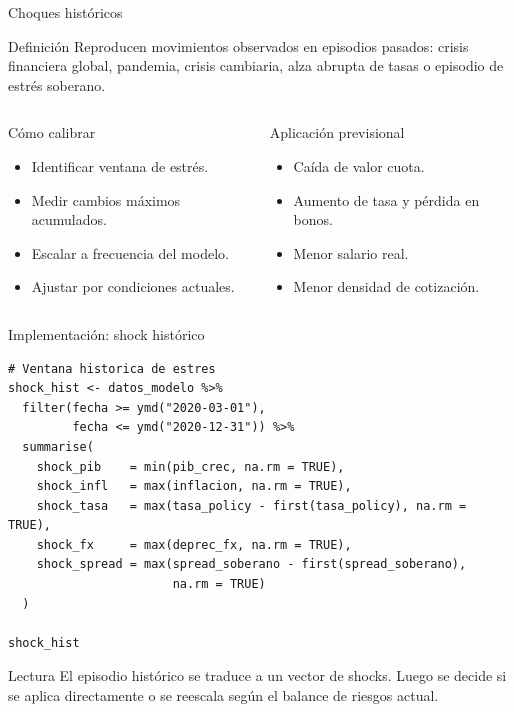 \documentclass[10pt,aspectratio=169]{beamer}
\begin{document}
\begin{frame}{Choques históricos}
\begin{block}{Definición}
Reproducen movimientos observados en episodios pasados: crisis financiera global, pandemia, crisis cambiaria, alza abrupta de tasas o episodio de estrés soberano.
\end{block}

\begin{columns}
\begin{block}{Cómo calibrar}
\begin{itemize}
  \item Identificar ventana de estrés.
  \item Medir cambios máximos acumulados.
  \item Escalar a frecuencia del modelo.
  \item Ajustar por condiciones actuales.
\end{itemize}
\end{block}

\begin{block}{Aplicación previsional}
\begin{itemize}
  \item Caída de valor cuota.
  \item Aumento de tasa y pérdida en bonos.
  \item Menor salario real.
  \item Menor densidad de cotización.
\end{itemize}
\end{block}
\end{columns}
\end{frame}

\begin{frame}[fragile]{Implementación: shock histórico}
\begin{lstlisting}
# Ventana historica de estres
shock_hist <- datos_modelo %>%
  filter(fecha >= ymd("2020-03-01"),
         fecha <= ymd("2020-12-31")) %>%
  summarise(
    shock_pib    = min(pib_crec, na.rm = TRUE),
    shock_infl   = max(inflacion, na.rm = TRUE),
    shock_tasa   = max(tasa_policy - first(tasa_policy), na.rm = TRUE),
    shock_fx     = max(deprec_fx, na.rm = TRUE),
    shock_spread = max(spread_soberano - first(spread_soberano),
                       na.rm = TRUE)
  )

shock_hist
\end{lstlisting}

\begin{block}{Lectura}
El episodio histórico se traduce a un vector de shocks. Luego se decide si se aplica directamente o se reescala según el balance de riesgos actual.
\end{block}
\end{frame}
\end{document}

